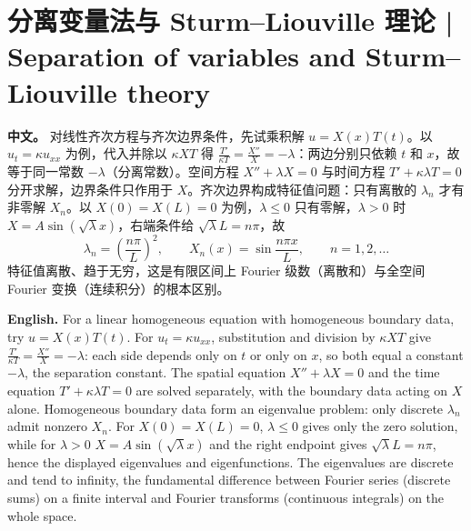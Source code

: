 \documentclass[UTF8,11pt,a4paper]{ctexart}
\newcommand{\APS}[2]{\par\noindent\textbf{中文。} #1\par\noindent\textbf{English.} #2\par\smallskip}
\begin{document}
\section[分离变量法]{分离变量法与 Sturm--Liouville 理论 | Separation of variables and Sturm--Liouville theory}
\APS{对线性齐次方程与齐次边界条件，先试乘积解 $u=X(x)T(t)$。以 $u_t=\kappa u_{xx}$ 为例，代入并除以 $\kappa XT$ 得 $\frac{T'}{\kappa T}=\frac{X''}{X}=-\lambda$：两边分别只依赖 $t$ 和 $x$，故等于同一常数 $-\lambda$（分离常数）。空间方程 $X''+\lambda X=0$ 与时间方程 $T'+\kappa\lambda T=0$ 分开求解，边界条件只作用于 $X$。齐次边界构成特征值问题：只有离散的 $\lambda_n$ 才有非零解 $X_n$。以 $X(0)=X(L)=0$ 为例，$\lambda\le0$ 只有零解，$\lambda>0$ 时 $X=A\sin(\sqrt\lambda x)$，右端条件给 $\sqrt\lambda L=n\pi$，故
\[
\lambda_n=\left(\frac{n\pi}{L}\right)^2,\qquad X_n(x)=\sin\frac{n\pi x}{L},\qquad n=1,2,\dots
\]
特征值离散、趋于无穷，这是有限区间上 Fourier 级数（离散和）与全空间 Fourier 变换（连续积分）的根本区别。}{For a linear homogeneous equation with homogeneous boundary data, try $u=X(x)T(t)$. For $u_t=\kappa u_{xx}$, substitution and division by $\kappa XT$ give $\frac{T'}{\kappa T}=\frac{X''}{X}=-\lambda$: each side depends only on $t$ or only on $x$, so both equal a constant $-\lambda$, the separation constant. The spatial equation $X''+\lambda X=0$ and the time equation $T'+\kappa\lambda T=0$ are solved separately, with the boundary data acting on $X$ alone. Homogeneous boundary data form an eigenvalue problem: only discrete $\lambda_n$ admit nonzero $X_n$. For $X(0)=X(L)=0$, $\lambda\le0$ gives only the zero solution, while for $\lambda>0$ $X=A\sin(\sqrt\lambda x)$ and the right endpoint gives $\sqrt\lambda L=n\pi$, hence the displayed eigenvalues and eigenfunctions. The eigenvalues are discrete and tend to infinity, the fundamental difference between Fourier series (discrete sums) on a finite interval and Fourier transforms (continuous integrals) on the whole space.}
\end{document}
